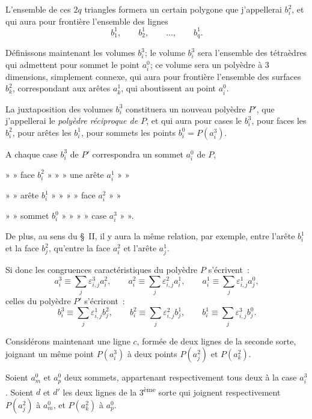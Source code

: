 \documentclass{article}
\begin{document}
L'ensemble de ces $2q$ triangles formera un certain polygone que j'appellerai $b^{2}_{i}$, et qui aura pour frontière l'ensemble des lignes
\[ b^{1}_{1}, \qquad b^{1}_{2}, \qquad \ldots, \qquad b^{1}_{q}. \]

Définissons maintenant les volumes $b^{3}_{i}$; le volume $b^{3}_{i}$ sera l'ensemble des tétraèdres qui admettent pour sommet le point $a^{0}_{i}$; ce volume sera un polyèdre à 3 dimensions, simplement connexe, qui aura pour frontière l'ensemble des surfaces $b^{2}_{k}$, correspondant aux arêtes $a^{1}_{k}$, qui aboutissent au point $a^{0}_{i}$.

La juxtaposition des volumes $b^{3}_{i}$ constituera un nouveau polyèdre $P'$, que j'appellerai le \emph{polyèdre réciproque de $P$}, et qui aura pour cases le $b^{3}_{i}$, pour faces les $b^{2}_{i}$, pour arêtes les $b^{1}_{i}$, pour sommets les points $b^{0}_{i} = P(a^{3}_{i})$.

A chaque case $b^{3}_{i}$ de $P'$ correspondra un sommet $a^{0}_{i}$ de $P$,

» » face $b^{2}_{i}$ » » » une arête $a^{1}_{i}$ » »

» » arête $b^{1}_{i}$ » » » » face $a^{2}_{i}$ » »

» » sommet $b^{0}_{i}$ » » » » case $a^{3}_{i}$ » ».

De plus, au sens du \S~II, il y aura la même relation, par exemple, entre l'arête $b^{1}_{i}$ et la face $b^{2}_{j}$, qu'entre la face $a^{2}_{i}$ et l'arête $a^{1}_{j}$.

Si donc les congruences caractéristiques du polyèdre $P$ s'écrivent~:
\[ a^{3}_{i} \equiv \sum_{j} \varepsilon^{3}_{i,j} a^{2}_{i}, \qquad a^{2}_{i} \equiv \sum_{j} \varepsilon^{2}_{i,j} a^{1}_{i}, \qquad a^{1}_{i} \equiv \sum_{j} \varepsilon^{1}_{i,j} a^{0}_{j}, \]
celles du polyèdre $P'$ s'écriront~:
\[ b^{3}_{i} \equiv \sum_{j} \varepsilon^{1}_{i,j} b^{2}_{j}, \qquad b^{2}_{i} \equiv \sum_{j} \varepsilon^{2}_{i,j} b^{1}_{j}, \qquad b^{1}_{i} \equiv \sum_{j} \varepsilon^{3}_{i,j} b^{0}_{j}. \]

Considérons maintenant une ligne $c$, formée de deux lignes de la seconde sorte, joignant un même point $P(a^{3}_{i})$ à deux points $P(a^{2}_{j})$ et $P(a^{2}_{k})$.

Soient $a^{0}_{m}$ et $a^{0}_{p}$ deux sommets, appartenant respectivement tous deux à la case $a^{3}_{i}$. Soient $d$ et $d'$ les deux lignes de la 3\textsuperscript{ème} sorte qui joignent respectivement $P(a^{2}_{j})$ à $a^{0}_{m}$, et $P(a^{2}_{k})$ à $a^{0}_{p}$.
\end{document}
